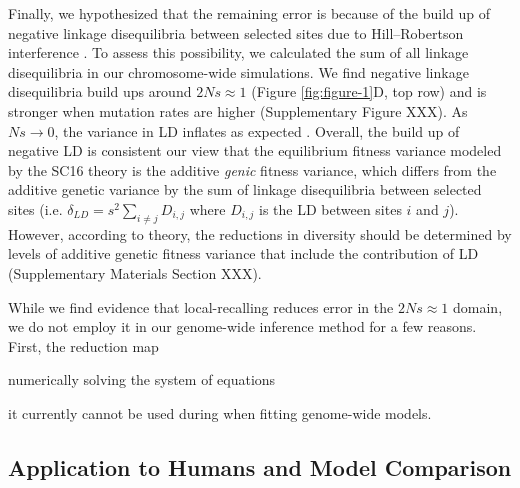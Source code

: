 \documentclass[11pt]{article}
\begin{document}
Finally, we hypothesized that the remaining error is because of the build up of
negative linkage disequilibria between selected sites due to Hill--Robertson
interference \parencite{Hill1966-kd,McVean2000-bt,Comeron2007-wq}. To assess
this possibility, we calculated the sum of all linkage disequilibria in our
chromosome-wide simulations. We find negative linkage disequilibria build ups
around $2Ns \approx 1$ (Figure \ref{fig:figure-1}D, top row) and is stronger
when mutation rates are higher (Supplementary Figure XXX). As $Ns \to 0$, the
variance in LD inflates as expected \parencite{Ohta1969-ae,Hill1968-ue}.
Overall, the build up of negative LD is consistent our view that the
equilibrium fitness variance modeled by the SC16 theory is the additive
\emph{genic} fitness variance, which differs from the additive genetic variance
by the sum of linkage disequilibria between selected sites (i.e. $\delta_{LD} =
s^2 \sum_{i\ne j} D_{i,j}$ where $D_{i,j}$ is the LD between sites $i$ and
$j$). However, according to theory, the reductions in diversity should be
determined by levels of additive genetic fitness variance that include the
contribution of LD (Supplementary Materials Section XXX).

While we find evidence that local-recalling reduces error in the $2Ns \approx
1$ domain, we do not employ it in our genome-wide inference method for a few
reasons. First, the reduction map 

numerically solving the system of equations 

it currently cannot be used during when fitting
genome-wide models.

\subsection*{Application to Humans and Model Comparison}
\end{document}
